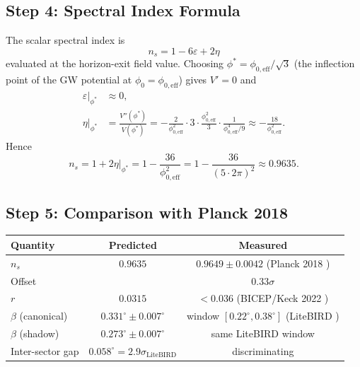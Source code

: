 \documentclass[12pt,a4paper]{article}
\begin{document}
\subsection*{Step 4: Spectral Index Formula}

The scalar spectral index is
\begin{equation}
  \boxed{n_s = 1 - 6\varepsilon + 2\eta}
  \label{ns-eq:ns}
\end{equation}
evaluated at the horizon-exit field value.  Choosing $\phi^* = \phi_{0,\mathrm{eff}}/\sqrt{3}$
(the inflection point of the GW potential at $\phi_0 = \phi_{0,\mathrm{eff}}$)
gives $V' = 0$ and
\begin{align}
  \varepsilon\big|_{\phi^*} &\approx 0 ,\\
  \eta\big|_{\phi^*} &= \frac{V''(\phi^*)}{V(\phi^*)}
    = -\frac{2}{\phi_{0,\mathrm{eff}}^2}\cdot 3 \cdot \frac{\phi_{0,\mathrm{eff}}^2}{3}
     \cdot \frac{1}{\phi_{0,\mathrm{eff}}^4/9}
    \approx -\frac{18}{\phi_{0,\mathrm{eff}}^2} .
\end{align}
Hence
\begin{equation}
  n_s = 1 + 2\eta\big|_{\phi^*}
      = 1 - \frac{36}{\phi_{0,\mathrm{eff}}^2}
      = 1 - \frac{36}{(5\cdot 2\pi)^2}
      \approx \mathbf{0.9635} .
  \label{ns-eq:ns-result}
\end{equation}

\subsection*{Step 5: Comparison with Planck 2018}

\begin{center}
\begin{tabular}{lcc}
\hline
Quantity & Predicted & Measured \\
\hline
$n_s$ & $0.9635$ & $0.9649 \pm 0.0042$ (Planck 2018 \citep{Planck2018}) \\
Offset & & $0.33\sigma$ \\
$r$ & $0.0315$ & $< 0.036$ (BICEP/Keck 2022 \citep{BICEPKeck2022}) \\
$\beta$ (canonical) & $0.331^\circ \pm 0.007^\circ$ & window $[0.22^\circ, 0.38^\circ]$ (LiteBIRD \citep{LiteBIRD2023}) \\
$\beta$ (shadow) & $0.273^\circ \pm 0.007^\circ$ & same LiteBIRD window \\
Inter-sector gap & $0.058^\circ = 2.9\sigma_\mathrm{LiteBIRD}$ & discriminating \\
\hline
\end{tabular}
\end{center}
\end{document}
